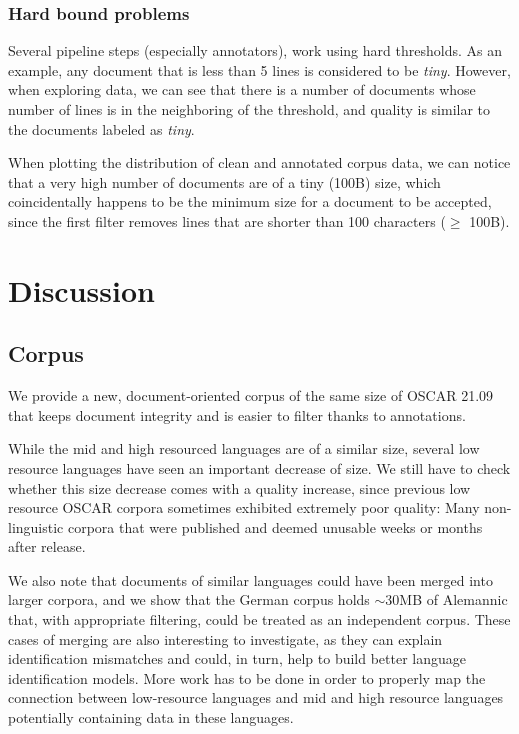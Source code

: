 \subsubsection{Hard bound problems}

Several pipeline steps (especially annotators), work using hard thresholds. As an example, any document that is less than 5 lines is considered to be \textit{tiny}. However, when exploring data, we can see that there is a number of documents whose number of lines is in the neighboring of the threshold, and quality is similar to the documents labeled as \textit{tiny}.

When plotting the distribution of clean and annotated corpus data, we can notice that a very high number of documents are of a tiny (100B) size, which coincidentally happens to be the minimum size for a document to be accepted, since the first filter removes lines that are shorter than 100 characters ($\geq$ 100B).


\section{Discussion}


\subsection{Corpus}
We provide a new, document-oriented corpus of the same size of OSCAR 21.09 that keeps document integrity and is easier to filter thanks to annotations.

While the mid and high resourced languages are of a similar size, several low resource languages have seen an important decrease of size.
We still have to check whether this size decrease comes with a quality increase, since previous low resource OSCAR corpora sometimes exhibited extremely poor quality: Many non-linguistic corpora that were published and deemed unusable weeks or months after release.

We also note that documents of similar languages could have been merged into larger corpora, and we show that the German corpus holds $\sim 30$MB of Alemannic that, with appropriate filtering, could be treated as an independent corpus. These cases of merging are also interesting to investigate, as they can explain identification mismatches and could, in turn, help to build better language identification models.
More work has to be done in order to properly map the connection between low-resource languages and mid and high resource languages potentially containing data in these languages.

